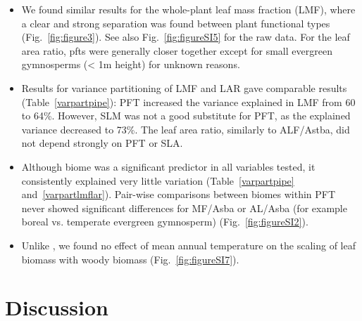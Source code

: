 \documentclass[a4paper]{article}\usepackage[]{graphicx}\usepackage[]{color}
\begin{document}
\begin{itemize}
\item We found similar results for the whole-plant leaf mass fraction (LMF), where a clear and strong separation was found between plant functional types (Fig.~\ref{fig:figure3}). See also Fig.~\ref{fig:figureSI5} for the raw data. For the leaf area ratio, pfts were generally closer together except for small evergreen gymnosperms (< 1m height) for unknown reasons. 

\item Results for variance partitioning of LMF and LAR gave comparable results (Table~\ref{varpartpipe}): PFT increased the variance explained in LMF from 60 to 64\%. However, SLM was not a good substitute for PFT, as the explained variance decreased to 73\%. The leaf area ratio, similarly to ALF/Astba, did not depend strongly on PFT or SLA.

\item Although biome was a significant predictor in all variables tested, it consistently explained very little variation (Table~\ref{varpartpipe} and~\ref{varpartlmflar}). Pair-wise comparisons between biomes within PFT never showed significant differences for MF/Asba or AL/Asba (for example boreal vs. temperate evergreen gymnosperm) (Fig.~\ref{fig:figureSI2}).

\item Unlike \cite{reich_temperature_2014}, we found no effect of mean annual temperature on the scaling of leaf biomass with woody biomass (Fig.~\ref{fig:figureSI7}).


\end{itemize}


\section{Discussion}
\end{document}
